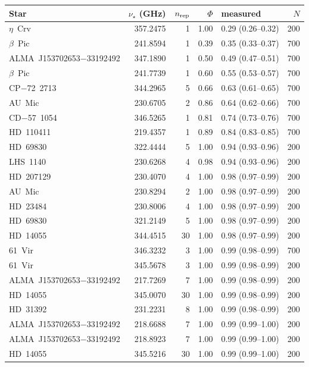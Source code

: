 \begin{tabular}{@{}l@{~~}r@{~~}r@{~~}r@{~~}l@{~~}r@{}}
\hline
Star & $\nu_\star$ (GHz) & $n_{\rm rep}$ & $\Phi$ & measured & $N$ \\
\hline
$\eta$~Crv & 357.2475 & 1 & 1.00 & 0.29 (0.26--0.32) & 200 \\
$\beta$~Pic & 241.8594 & 1 & 0.39 & 0.35 (0.33--0.37) & 700 \\
ALMA~J153702653$-$33192492 & 347.1890 & 1 & 0.50 & 0.49 (0.47--0.51) & 700 \\
$\beta$~Pic & 241.7739 & 1 & 0.60 & 0.55 (0.53--0.57) & 700 \\
CP$-$72~2713 & 344.2965 & 5 & 0.66 & 0.63 (0.61--0.65) & 700 \\
AU~Mic & 230.6705 & 2 & 0.86 & 0.64 (0.62--0.66) & 700 \\
CD$-$57~1054 & 346.5265 & 1 & 0.81 & 0.74 (0.73--0.76) & 700 \\
HD~110411 & 219.4357 & 1 & 0.89 & 0.84 (0.83--0.85) & 700 \\
HD~69830 & 322.4444 & 5 & 1.00 & 0.94 (0.93--0.96) & 200 \\
LHS~1140 & 230.6268 & 4 & 0.98 & 0.94 (0.93--0.96) & 200 \\
HD~207129 & 230.4070 & 4 & 1.00 & 0.98 (0.97--0.99) & 200 \\
AU~Mic & 230.8294 & 2 & 1.00 & 0.98 (0.97--0.99) & 200 \\
HD~23484 & 230.8006 & 4 & 1.00 & 0.98 (0.97--0.99) & 200 \\
HD~69830 & 321.2149 & 5 & 1.00 & 0.98 (0.97--0.99) & 200 \\
HD~14055 & 344.4515 & 30 & 1.00 & 0.98 (0.97--0.99) & 200 \\
61~Vir & 346.3232 & 3 & 1.00 & 0.99 (0.98--0.99) & 700 \\
61~Vir & 345.5678 & 3 & 1.00 & 0.99 (0.98--0.99) & 200 \\
ALMA~J153702653$-$33192492 & 217.7269 & 7 & 1.00 & 0.99 (0.98--0.99) & 200 \\
HD~14055 & 345.0070 & 30 & 1.00 & 0.99 (0.98--0.99) & 200 \\
HD~31392 & 231.2231 & 8 & 1.00 & 0.99 (0.98--0.99) & 200 \\
ALMA~J153702653$-$33192492 & 218.6688 & 7 & 1.00 & 0.99 (0.99--1.00) & 200 \\
ALMA~J153702653$-$33192492 & 218.8923 & 7 & 1.00 & 0.99 (0.99--1.00) & 200 \\
HD~14055 & 345.5216 & 30 & 1.00 & 0.99 (0.99--1.00) & 200 \\

\end{tabular}
